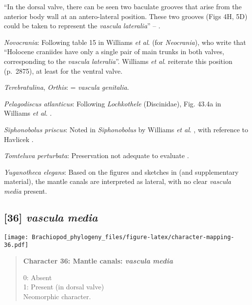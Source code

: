 \documentclass[openany]{book}
\theoremstyle{definition}
\theoremstyle{definition}
\theoremstyle{definition}
\theoremstyle{remark}
\begin{document}
``In the dorsal valve, there can be seen two baculate grooves that arise
from the\\
anterior body wall at an antero-lateral position. These two grooves
(Figs 4H, 5D) could be taken to represent the \emph{vascula}
\emph{lateralia}'' -- \citet{Zhang2007Agregarious}.

\hypertarget{Novocrania-coding-35}{}
\emph{Novocrania}: Following table 15 in Williams \emph{et al}.
\citeyearpar{Williams2000LinguliformeaCraniiformea} (for
\emph{Neocrania}), who write that ``Holocene craniides have only a
single pair of main trunks in both valves, corresponding to the
\emph{vascula} \emph{lateralia}''. Williams \emph{et al}.
\citeyearpar{Williams2007Supplement} reiterate this position (p.~2875),
at least for the ventral valve.

\hypertarget{Orthis-coding-35}{}
\emph{Terebratulina}, \emph{Orthis}: = \emph{vascula} \emph{genitalia}.

\hypertarget{Pelagodiscus_atlanticus-coding-35}{}
\emph{Pelagodiscus atlanticus}: Following \emph{Lochkothele}
(Discinidae), Fig. 43.4a in Williams \emph{et al}.
\citeyearpar{Williams2000LinguliformeaCraniiformea}.

\hypertarget{Siphonobolus_priscus-coding-35}{}
\emph{Siphonobolus priscus}: Noted in \emph{Siphonobolus} by Williams
\emph{et al}. \citeyearpar{Williams2000LinguliformeaCraniiformea}, with
reference to Havlicek \citeyearpar{Havlicek1982LingulaceaPaterinacea}.

\hypertarget{Tomteluva_perturbata-coding-35}{}
\emph{Tomteluva perturbata}: Preservation not adequate to evaluate
\citep{Streng2016Anew}.

\hypertarget{Yuganotheca_elegans-coding-35}{}
\emph{Yuganotheca elegans}: Based on the figures and sketches in
\citet{Zhang2014Anearly} (and supplementary material), the mantle canals
are interpreted as lateral, with no clear \emph{vascula} \emph{media}
present.

\subsection*{\texorpdfstring{{[}36{]} \emph{vascula}
\emph{media}}{{[}36{]} vascula media}}\label{vascula-media}

\texttt{[image: Brachiopod\_phylogeny\_files/figure-latex/character-mapping-36.pdf]}

\begin{quote}
\textbf{Character 36: Mantle canals: \emph{vascula} \emph{media}}

0: Absent\\
1: Present (in dorsal valve)\\
Neomorphic character.
\end{quote}
\end{document}
